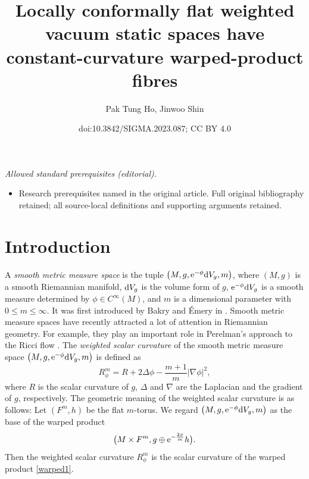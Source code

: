 \documentclass[10pt,a4paper]{amsart}
\title{Locally conformally flat weighted vacuum static spaces have constant-curvature warped-product fibres}
\author{Pak Tung Ho, Jinwoo Shin}
\date{doi:10.3842/SIGMA.2023.087; CC BY 4.0}
\numberwithin{equation}{section}
\begin{document}
\maketitle
\noindent\textit{Allowed standard prerequisites (editorial).}\begin{itemize}
\item Research prerequisites named in the original article. Full original bibliography retained; all source-local definitions and supporting arguments retained.
\end{itemize}\medskip
\section{Introduction}

A \textit{smooth metric measure space} is the tuple $\bigl(M,g,{\rm e}^{-\phi}{\rm d}V_g,m\bigr)$, where $(M,g)$ is a smooth Riemannian manifold, ${\rm d}V_g$ is the volume form of $g$, ${\rm e}^{-\phi}{\rm d}V_g$ is a smooth measure determined by $\phi\in C^\infty(M)$, and $m$ is a dimensional parameter with $0\leq m\leq \infty$. It was first introduced by Bakry and \'{E}mery in \cite{Bakry&Emery}. Smooth metric measure spaces have recently attracted a lot of attention in Riemannian geometry. For example, they play an important role in Perelman's approach to the Ricci flow \cite{Perelman}.
The \textit{weighted scalar curvature} of the smooth metric measure space $\bigl(M,g,{\rm e}^{-\phi}{\rm d}V_g,m\bigr)$ is defined as
\begin{equation}\label{wsc}
 R_\phi^m=R+2\Delta \phi-\frac{m+1}{m}|\nabla \phi|^2,
\end{equation}
where $R$ is the scalar curvature of $g$, $\Delta$ and $\nabla$ are the Laplacian and the gradient of $g$, respectively. The geometric meaning of the weighted scalar curvature is as follows: Let $(F^m,h)$ be the flat $m$-torus. We regard $\bigl(M,g,{\rm e}^{-\phi}{\rm d}V_g,m\bigr)$ as the base of the warped product
\begin{equation}\label{warped1}
 \bigl(M\times F^m,g\oplus {\rm e}^{-\frac{2\phi}{m}}h\bigr).
\end{equation}
Then the weighted scalar curvature $R_\phi^m$ is the scalar curvature of the warped product \eqref{warped1}.
\end{document}
